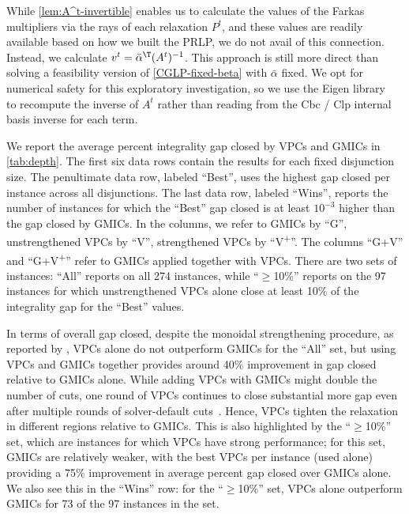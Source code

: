 \documentclass[oribibl,envcountsame]{llncs}
\theoremstyle{remark}
\theoremstyle{definition}
\newcommand{\goodVPCSet}{$\ge$10\%}
\begin{document}
While \cref{lem:A^t-invertible} enables us to calculate the values of the Farkas multipliers via the rays of each relaxation $P^t$,
and these values are readily available based on how we built the PRLP, we do not avail of this connection.
Instead, we calculate $v^t = \bar{\alpha}^\T (A^t)^{-1}$.
This approach is still more direct than solving a feasibility version of \cref{CGLP-fixed-beta} with $\bar{\alpha}$ fixed.
We opt for numerical safety for this exploratory investigation, so we use the Eigen library~\cite{Eigen3} to recompute the inverse of $A^t$ rather than reading from the Cbc / Clp internal basis inverse for each term.

We report the average percent integrality gap closed by VPCs and GMICs in \cref{tab:depth}.
The first six data rows contain the results for each fixed disjunction size.
The penultimate data row, labeled ``Best'', uses the highest gap closed per instance across all disjunctions.
The last data row, labeled ``Wins'', reports the number of instances for which the ``Best'' gap closed is at least $10^{-3}$ higher than the gap closed by GMICs.
In the columns, we refer to
GMICs by ``G'',
unstrengthened VPCs by ``V'',
strengthened VPCs by ``V\textsuperscript{+}''.
The columns ``G+V'' and ``G+V\textsuperscript{+}'' refer to GMICs applied together with VPCs.
There are two sets of instances: ``All'' reports on all 274 instances, 
while ``\goodVPCSet'' reports on the 97 instances for which unstrengthened VPCs alone close at least 10\% of the integrality gap for the ``Best'' values.

In terms of overall gap closed, despite the monoidal strengthening procedure,
as reported by \citet{BalKaz22+_vpc-arxiv}, VPCs alone do not outperform GMICs for the ``All'' set,
but using VPCs and GMICs together provides around 40\% improvement in gap closed relative to GMICs alone.
While adding VPCs with GMICs might double the number of cuts,
one round of VPCs continues to close substantial more gap even after multiple rounds of solver-default cuts~\cite{BalKaz22+_vpc-arxiv}.
Hence, VPCs tighten the relaxation in different regions relative to GMICs.
This is also highlighted by the ``\goodVPCSet'' set, which are instances for which VPCs have strong performance;
for this set, GMICs are relatively weaker, with the best VPCs per instance (used alone) providing a 75\% improvement in average percent gap closed over GMICs alone.
We also see this in the ``Wins'' row: for the ``\goodVPCSet'' set, VPCs alone outperform GMICs for 73 of the 97 instances in the set.
\end{document}
